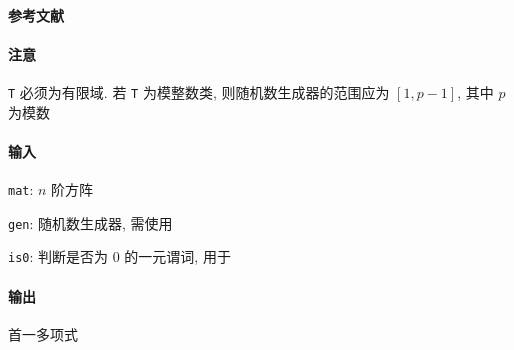 \paragraph{参考文献} \cite{wiedemann1986solving}

\paragraph{注意} \verb|T| 必须为有限域. 若 \verb|T| 为模整数类, 则随机数生成器的范围应为 \([1, p-1]\), 其中 \(p\) 为模数

\paragraph{输入}

\verb|mat|: \(n\) 阶方阵

\verb|gen|: 随机数生成器, 需使用 

\verb|is0|: 判断是否为 \(0\) 的一元谓词, 用于 

\paragraph{输出} 首一多项式
